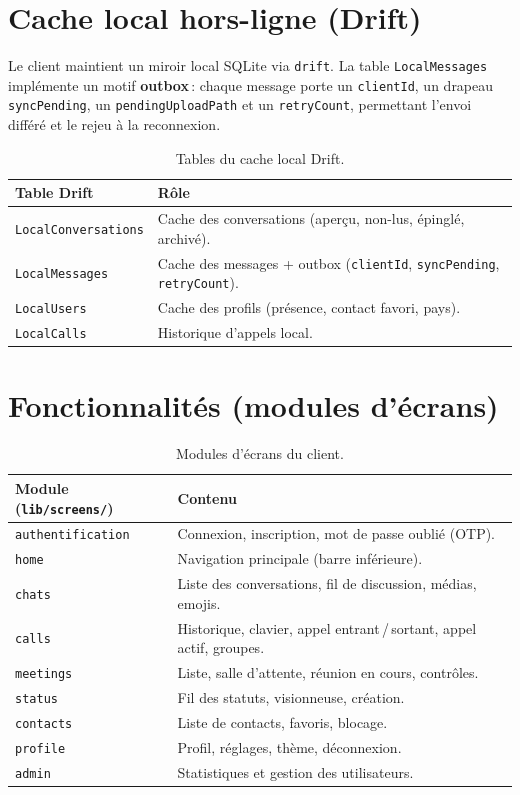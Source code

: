 \documentclass[11pt,a4paper,oneside]{report}
\newcommand{\thd}[1]{\textbf{\textcolor{AlanyaIndigoDark}{#1}}}
\begin{document}
\section{Cache local hors-ligne (Drift)}
Le client maintient un miroir local SQLite via \texttt{drift}. La table
\texttt{LocalMessages} impl\'{e}mente un motif \textbf{outbox}\,: chaque message porte
un \texttt{clientId}, un drapeau \texttt{syncPending}, un \texttt{pendingUploadPath}
et un \texttt{retryCount}, permettant l'envoi diff\'{e}r\'{e} et le rejeu \`{a} la reconnexion.

\begin{table}[H]
\centering\small
\begin{tabularx}{\linewidth}{@{}l X@{}}
\toprule
\thd{Table Drift} & \thd{R\^{o}le}\\
\midrule
\texttt{LocalConversations} & Cache des conversations (aper\c{c}u, non-lus, \'{e}pingl\'{e}, archiv\'{e}).\\
\texttt{LocalMessages}      & Cache des messages + outbox (\texttt{clientId}, \texttt{syncPending}, \texttt{retryCount}).\\
\texttt{LocalUsers}         & Cache des profils (pr\'{e}sence, contact favori, pays).\\
\texttt{LocalCalls}         & Historique d'appels local.\\
\bottomrule
\end{tabularx}
\caption{Tables du cache local Drift.}
\end{table}

\section{Fonctionnalit\'{e}s (modules d'\'{e}crans)}
\begin{table}[H]
\centering\small
\begin{tabularx}{\linewidth}{@{}l X@{}}
\toprule
\thd{Module (\texttt{lib/screens/})} & \thd{Contenu}\\
\midrule
\texttt{authentification} & Connexion, inscription, mot de passe oubli\'{e} (OTP).\\
\texttt{home}     & Navigation principale (barre inf\'{e}rieure).\\
\texttt{chats}    & Liste des conversations, fil de discussion, m\'{e}dias, emojis.\\
\texttt{calls}    & Historique, clavier, appel entrant\,/\,sortant, appel actif, groupes.\\
\texttt{meetings} & Liste, salle d'attente, r\'{e}union en cours, contr\^{o}les.\\
\texttt{status}   & Fil des statuts, visionneuse, cr\'{e}ation.\\
\texttt{contacts} & Liste de contacts, favoris, blocage.\\
\texttt{profile}  & Profil, r\'{e}glages, th\`{e}me, d\'{e}connexion.\\
\texttt{admin}    & Statistiques et gestion des utilisateurs.\\
\bottomrule
\end{tabularx}
\caption{Modules d'\'{e}crans du client.}
\end{table}
\end{document}
